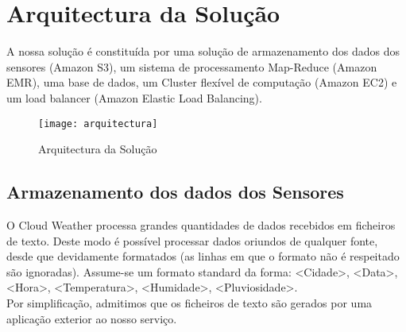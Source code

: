 
\chapter{Arquitectura da Solução} %
\label{Chapter3} %


A nossa solução é constituída por uma solução de armazenamento dos dados dos sensores (Amazon S3), um sistema de processamento Map-Reduce (Amazon EMR), uma base de dados, um Cluster flexível de computação (Amazon EC2) e um load balancer (Amazon Elastic Load Balancing).
\begin{figure}[htb]
\centering
\texttt{[image: arquitectura]}
\caption{Arquitectura da Solução}
\label{fig:arquitectura}
\end{figure}


\section{Armazenamento dos dados dos Sensores}
O Cloud Weather processa grandes quantidades de dados recebidos em ficheiros de texto. Deste modo é possível processar dados oriundos de qualquer fonte, desde que devidamente formatados (as linhas em que o formato não é respeitado são ignoradas). Assume-se um formato standard da forma: <Cidade>, <Data>, <Hora>, <Temperatura>, <Humidade>, <Pluviosidade>.\\
Por simplificação, admitimos que os ficheiros de texto são gerados por uma aplicação exterior ao nosso serviço.
